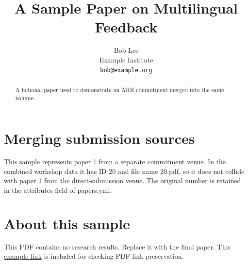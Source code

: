 \documentclass[11pt,a4paper]{article}
\title{A Sample Paper on Multilingual Feedback}
\author{Bob Lee\\Example Institute\\\texttt{bob@example.org}}
\date{}
\begin{document}
\maketitle
\thispagestyle{empty}
\begin{abstract}
A fictional paper used to demonstrate an ARR commitment merged into the same volume.
\end{abstract}
\section{Merging submission sources}
This sample represents paper 1 from a separate commitment venue. In the
combined workshop data it has ID 20 and file name 20.pdf, so it does not
collide with paper 1 from the direct-submission venue. The original number
is retained in the attributes field of papers.yml.
\section{About this sample}
This PDF contains no research results. Replace it with the final paper.
This \href{https://example.org}{example link} is included for checking
PDF link preservation.
\end{document}
